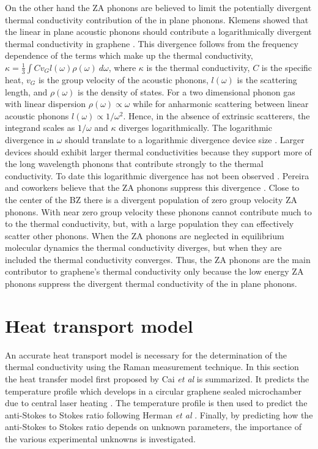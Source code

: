 On the other hand the ZA phonons are believed to limit the potentially divergent thermal conductivity contribution of the in plane phonons.
Klemens showed that the linear in plane acoustic phonons should contribute a logarithmically divergent thermal conductivity in graphene \cite{Klemens2001}.
This divergence follows from the frequency dependence of the terms which make up the thermal conductivity, $\kappa=\frac{1}{3} \int C v_G l(\omega) \rho(\omega) \ d\omega $, where $\kappa$ is the thermal conductivity, $C$ is the specific heat, $v_G$ is the group velocity of the acoustic phonons, $l(\omega)$ is the scattering length, and $\rho(\omega)$ is the density of states.
For a two dimensional phonon gas with linear dispersion $\rho(\omega) \propto \omega$ while for anharmonic scattering between linear acoustic phonons $l(\omega) \propto 1/\omega^2$.
Hence, in the absence of extrinsic scatterers, the integrand scales as $1/\omega$ and $\kappa$ diverges logarithmically.
The logarithmic divergence in $\omega$ should translate to a logarithmic divergence device size \cite{Klemens2001}.
Larger devices should exhibit larger thermal conductivities because they support more of the long wavelength phonons that contribute strongly to the thermal conductivity.
To date this logarithmic divergence has not been observed \cite{Chen2011a}.
Pereira and coworkers believe that the ZA phonons suppress this divergence \cite{Pereira2013}.
Close to the center of the BZ there is a divergent population of zero group velocity ZA phonons.
With near zero group velocity these phonons cannot contribute much to to the thermal conductivity, but, with a large population they can effectively scatter other phonons.
When the ZA phonons are neglected in equilibrium molecular dynamics the thermal conductivity diverges, but when they are included the thermal conductivity converges.
Thus, the ZA phonons are the main contributor to graphene's thermal conductivity only because the low energy ZA phonons suppress the divergent thermal conductivity of the in plane phonons.

\section{Heat transport model}
An accurate heat transport model is necessary for the determination of the thermal conductivity using the Raman measurement technique.
In this section the heat transfer model first proposed by Cai \textit{et al} is summarized.
It predicts the temperature profile which develops in a circular graphene sealed microchamber due to central laser heating \cite{Cai2010}.
The temperature profile is then used to predict the anti-Stokes to Stokes ratio following Herman \textit{et al} \cite{Herman2011}.
Finally, by predicting how the anti-Stokes to Stokes ratio depends on unknown parameters, the importance of the various experimental unknowns is investigated.

